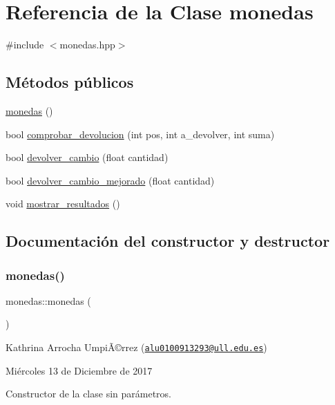 \hypertarget{classmonedas}{}\section{Referencia de la Clase monedas}
\label{classmonedas}


{\ttfamily \#include $<$monedas.\+hpp$>$}

\subsection*{Métodos públicos}
\begin{DoxyCompactItemize}
\item 
\hyperlink{classmonedas_ac076bd0d307e0ef9a4a3ad14a1a24c57}{monedas} ()
\item 
bool \hyperlink{classmonedas_a3503581dd367fb446e903ea74f206156}{comprobar\+\_\+devolucion} (int pos, int a\+\_\+devolver, int suma)
\item 
bool \hyperlink{classmonedas_aa1d4f92b35bfc29a2972d075abcb0e08}{devolver\+\_\+cambio} (float cantidad)
\item 
bool \hyperlink{classmonedas_a034d41cb66e5408e5b7a377bce6046bd}{devolver\+\_\+cambio\+\_\+mejorado} (float cantidad)
\item 
void \hyperlink{classmonedas_a1fc02876da5a98ecb96e81f62fda9ec6}{mostrar\+\_\+resultados} ()
\end{DoxyCompactItemize}


\subsection{Documentación del constructor y destructor}
\mbox{\label{classmonedas_ac076bd0d307e0ef9a4a3ad14a1a24c57}} 
\subsubsection{\texorpdfstring{monedas()}{monedas()}}
{\footnotesize\ttfamily monedas\+::monedas (\begin{DoxyParamCaption}{ }\end{DoxyParamCaption})}

Kathrina Arrocha UmpiÃ©rrez (\href{mailto:alu0100913293@ull.edu.es}{\tt alu0100913293@ull.\+edu.\+es})

Miércoles 13 de Diciembre de 2017

Constructor de la clase sin parámetros. 


